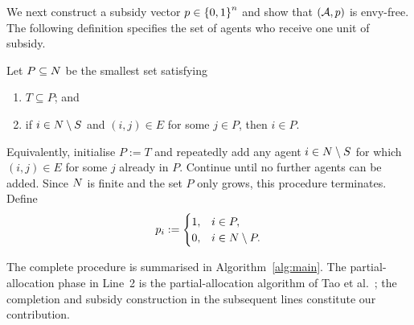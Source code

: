 We next construct a subsidy vector $p\in\left\{0,1\right\}^n$ and show
that $(\mathcal{A},p)$ is envy-free. The following definition
specifies the set of agents who receive one unit of subsidy.

\begin{definition}
\label{def:m-P}
Let $P\subseteq N$ be the smallest set satisfying
\begin{enumerate}
  \item[(P1)] $T\subseteq P$; and
  \item[(P2)] if $i\in N\setminus S$ and $(i,j)\in E$ for some
        $j\in P$, then $i\in P$.
\end{enumerate}
Equivalently, initialise $P:=T$ and repeatedly add any agent
$i\in N\setminus S$ for which $(i,j)\in E$ for some $j$ already
in $P$. Continue until no further agents can be added. Since $N$
is finite and the set $P$ only grows, this procedure terminates.
Define
\begin{equation}
\label{eq:m-subsidy}
  p_i :=
  \begin{cases}
    1, & i\in P,\\
    0, & i\in N\setminus P.
  \end{cases}
\end{equation}
\end{definition}

The complete procedure is summarised in
Algorithm~\ref{alg:main}. The partial-allocation phase in Line~2 is
the partial-allocation algorithm of Tao et al.~\cite{tao2025existence}; the completion and subsidy
construction in the subsequent lines constitute our contribution.

